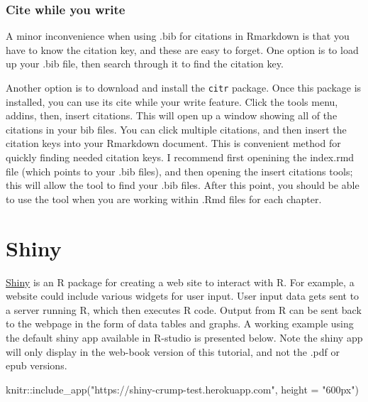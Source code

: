 \documentclass[
]{book}
\newenvironment{Shaded}{\begin{snugshade}}{\end{snugshade}}
\newcommand{\AttributeTok}[1]{\textcolor[rgb]{0.77,0.63,0.00}{#1}}
\newcommand{\FunctionTok}[1]{\textcolor[rgb]{0.00,0.00,0.00}{#1}}
\newcommand{\NormalTok}[1]{#1}
\newcommand{\SpecialCharTok}[1]{\textcolor[rgb]{0.00,0.00,0.00}{#1}}
\newcommand{\StringTok}[1]{\textcolor[rgb]{0.31,0.60,0.02}{#1}}
\begin{document}
\hypertarget{cite-while-you-write}{%
\subsection{Cite while you write}\label{cite-while-you-write}}

A minor inconvenience when using .bib for citations in Rmarkdown is that you have to know the citation key, and these are easy to forget. One option is to load up your .bib file, then search through it to find the citation key.

Another option is to download and install the \texttt{citr} package. Once this package is installed, you can use its cite while your write feature. Click the tools menu, addins, then, insert citations. This will open up a window showing all of the citations in your bib files. You can click multiple citations, and then insert the citation keys into your Rmarkdown document. This is convenient method for quickly finding needed citation keys. I recommend first openining the index.rmd file (which points to your .bib files), and then opening the insert citations tools; this will allow the tool to find your .bib files. After this point, you should be able to use the tool when you are working within .Rmd files for each chapter.

\hypertarget{shiny}{%
\chapter{Shiny}\label{shiny}}

\href{https://shiny.rstudio.com}{Shiny} is an R package for creating a web site to interact with R. For example, a website could include various widgets for user input. User input data gets sent to a server running R, which then executes R code. Output from R can be sent back to the webpage in the form of data tables and graphs. A working example using the default shiny app available in R-studio is presented below. Note the shiny app will only display in the web-book version of this tutorial, and not the .pdf or epub versions.

\begin{Shaded}
\begin{Highlighting}[]
\NormalTok{knitr}\SpecialCharTok{::}\FunctionTok{include\_app}\NormalTok{(}\StringTok{"https://shiny{-}crump{-}test.herokuapp.com"}\NormalTok{, }
  \AttributeTok{height =} \StringTok{"600px"}\NormalTok{)}
\end{Highlighting}
\end{Shaded}
\end{document}
